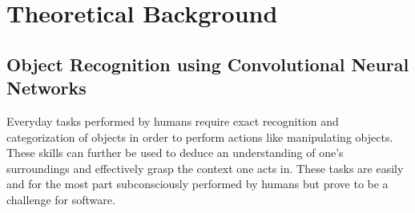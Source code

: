 

\chapter{Theoretical Background}

\section{Object Recognition using Convolutional Neural Networks}
Everyday tasks performed by humans require exact recognition and categorization of objects in order to perform actions like manipulating objects. 
These skills can further be used to deduce an understanding of one's surroundings and effectively grasp the context one acts in. These tasks are easily and for the most part subconsciously performed by humans but prove to be a challenge for software.\
